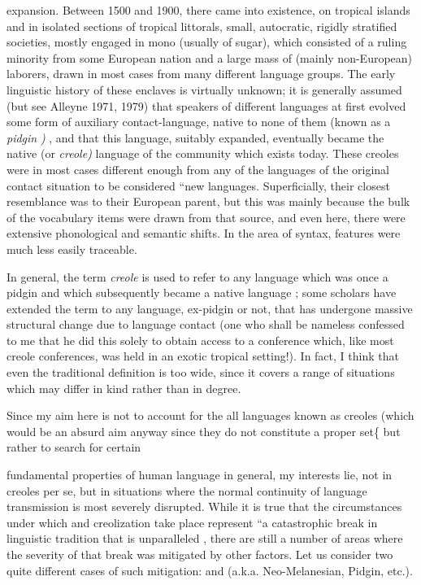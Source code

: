 expansion. Between 1500 and 1900, there came into existence, on tropical islands and in isolated sections of tropical littorals, small, autocratic, rigidly stratified societies, mostly engaged in mono (usually of sugar), which consisted of a ruling minority from some European nation and a large mass of (mainly non-European) laborers, drawn in most cases from many different language groups. The early linguistic history of these enclaves is virtually unknown; it is generally assumed (but see Alleyne 1971, 1979) that speakers of different lan\-guages at first evolved some form of auxiliary contact-language, native to none of them (known as a \textit{pidgin} \textit{)} , and that this language, suitably expanded, eventually became the native (or \textit{creol}\textit{e}\textit{) }language of the community which exists today. These creoles were in most cases different enough from any of the languages of the original contact situation to be considered ``new languages. Superficially, their closest resemblance was to their European parent, but this was mainly because the bulk of the vocabulary items were drawn from that source, and even here, there were extensive phonological and semantic shifts. In the area of syntax, features were much less easily traceable.

In general, the term \textit{creole} is used to refer to any language which was once a pidgin and which subsequently became a native language ; some scholars have extended the term to any language, ex-pidgin or not, that has undergone massive structural change due to language contact (one who shall be nameless confessed to me that he did this solely to obtain access to a conference which, like most creole conferences, was held in an exotic tropical setting!). In fact, I think that even the traditional definition is too wide, since it covers a range of situations which may differ in kind rather than in degree.

Since my aim here is not to account for the  all lan\-guages known as creoles (which would be an absurd aim anyway since they do not constitute a proper set\{ but rather to search for certain

fundamental properties of human language in general, my interests lie, not in creoles per se, but in situations where the normal continuity of language transmission is most severely disrupted. While it is true that the circumstances under which  and creolization take place represent ``a catastrophic break in linguistic tradition that is unparalleled \citep[24]{Sankoff1979}, there are still a number of areas where the severity of that break was mitigated by other factors. Let us consider two quite different cases of such mitigation:  and  (a.k.a. Neo-Melanesian,  Pidgin, etc.).

